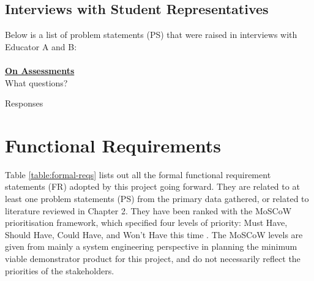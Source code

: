 \subsection{Interviews with Student Representatives}

Below is a list of problem statements (PS) that were raised in interviews with Educator A and B:\\
\\
\underline{\textbf{On Assessments}}
\\
What questions?

Responses

\section{Functional Requirements}

Table \ref{table:formal-reqs} lists out all the formal functional requirement statements (FR) adopted by this 
project going forward. They are related to at least one problem statements (PS) from the primary data 
gathered, or related to literature reviewed in Chapter 2. They have been ranked with the MoSCoW prioritisation
framework, which specified four levels of priority: Must Have, Should Have, Could Have, and Won’t Have 
this time \citep{agile2018moscow}. The MoSCoW levels are given from mainly a system engineering perspective 
in planning the minimum viable demonstrator product for this project, and do not necessarily reflect 
the priorities of the stakeholders.

